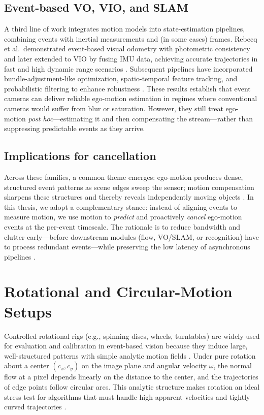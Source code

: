 \subsection{Event-based VO, VIO, and SLAM}
A third line of work integrates motion models into state-estimation pipelines, combining events with inertial measurements and (in some cases) frames. Rebecq et al.\ demonstrated event-based visual odometry with photometric consistency and later extended to VIO by fusing IMU data, achieving accurate trajectories in fast and high dynamic range scenarios \cite{Rebecq2017,Rebecq2019}. Subsequent pipelines have incorporated bundle-adjustment-like optimization, spatio-temporal feature tracking, and probabilistic filtering to enhance robustness \cite{Gallego2020Survey}. These results establish that event cameras can deliver reliable ego-motion estimation in regimes where conventional cameras would suffer from blur or saturation. However, they still treat ego-motion \emph{post hoc}—estimating it and then compensating the stream—rather than suppressing predictable events as they arrive.

\subsection{Implications for cancellation}
Across these families, a common theme emerges: ego-motion produces dense, structured event patterns as scene edges sweep the sensor; motion compensation sharpens these structures and thereby reveals independently moving objects \cite{Stoffregen2019Segmentation}. In this thesis, we adopt a complementary stance: instead of aligning events to measure motion, we use motion to \emph{predict} and proactively \emph{cancel} ego-motion events at the per-event timescale. The rationale is to reduce bandwidth and clutter early—before downstream modules (flow, VO/SLAM, or recognition) have to process redundant events—while preserving the low latency of asynchronous pipelines \cite{Gallego2018CMax,Bardow2016SOFIE}.

\section{Rotational and Circular-Motion Setups}
\label{sec:rotational-setups}

Controlled rotational rigs (e.g., spinning discs, wheels, turntables) are widely used for evaluation and calibration in event-based vision because they induce large, well-structured patterns with simple analytic motion fields \cite{Gallego2017Angular,Stoffregen2019Segmentation}. Under pure rotation about a center $(c_x,c_y)$ on the image plane and angular velocity $\omega$, the normal flow at a pixel depends linearly on the distance to the center, and the trajectories of edge points follow circular arcs. This analytic structure makes rotation an ideal stress test for algorithms that must handle high apparent velocities and tightly curved trajectories \cite{Gallego2017Angular}.

